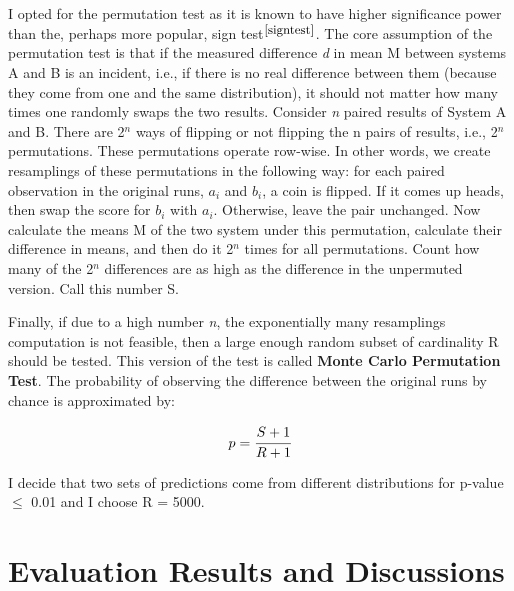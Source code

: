 I opted for the permutation test as it is known to have higher significance power than the, perhaps more popular, sign test$^{\small \cite{signtest}}$. The core assumption of the permutation test is that if the measured difference \textit{d} in mean M between systems A and B is an incident, i.e., if there is no real difference between them (because they come from one and the same distribution), it should not matter how many times one randomly swaps the two results. Consider \textit{n} paired results of System A and B. There are 2$^n$ ways of flipping or not flipping the n pairs of results, i.e., 2$^n$ permutations. These permutations operate row-wise. In other words, we create resamplings of these permutations in the following way: for each paired observation in the original runs, $a_i$ and $b_i$, a coin is flipped. If it comes up heads, then swap the score for $b_i$ with $a_i$. Otherwise, leave the pair unchanged. Now calculate the means M of the two system under this permutation, calculate their difference in means, and then do it 2$^n$ times for all permutations. Count how many of the 2$^n$ differences are as high as the difference in the unpermuted version. Call this number S. \smallskip

Finally, if due to a high number \textit{n}, the exponentially many resamplings computation is not feasible, then a large enough random subset of cardinality R should be tested. This version of the test is called \textbf{Monte Carlo Permutation Test}. The probability of observing the difference between the original runs by chance is approximated by: 

\begin{equation}
  p = \cfrac{S + 1}{R + 1}
\end{equation}

\smallskip

I decide that two sets of predictions come from different distributions for p-value $\leq$ 0.01 and I choose R = 5000.

\section{Evaluation Results and Discussions} \label{Evaluation Results}

